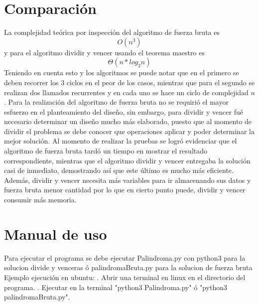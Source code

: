 \documentclass{article}
\begin{document}
\section{Comparación}
La complejidad teórica por inspección del algoritmo de fuerza bruta es 
\[
O(n^3)
\]
y para el algoritmo dividir y vencer  usando el teorema maestro es
\[ \Theta (n*log_2n)\] Teniendo en cuenta esto y los algoritmos se puede notar que en el primero se deben recorrer los 3 ciclos en el peor de los casos, mientras que para el segundo se realizan dos llamados recurrentes y en cada uno se hace un ciclo de complejidad \(n\).\newline
Para la realización del algoritmo de fuerza bruta no se requirió el mayor esfuerzo en el planteamiento del diseño, sin embargo, para dividir y vencer fué necesario determinar un diseño mucho más elaborado, puesto que al momento de dividir el problema se debe conocer que operaciones aplicar y poder determinar la mejor solución.\newline
Al momento de realizar la pruebas se logró evidenciar que el algoritmo de fuerza bruta tardó un tiempo en mostrar el resultado correspondiente, mientras que el algoritmo dividir y vencer entregaba la solución casi de inmediato, demostrando así que este último es mucho más eficiente.\newline 
Además, dividir y vencer necesita más variables para ir almacenando sus datos  y fuerza bruta menor cantidad  por lo que en cierto punto puede, dividir y vencer consumir más memoria.
\section{Manual de uso}
Para ejecutar el programa se debe ejecutar Palindroma.py con python3 para la solucion divide y venceras ó
palindromaBruta.py para la solucion de fuerza bruta
Ejemplo ejecución en ubuntu:\newline
    . Abrir una terminal en linux en el directorio del programa.\newline
    . Ejecutar en la terminal "python3 Palindroma.py" ó "python3 palindromaBruta.py".\newline
\end{document}
